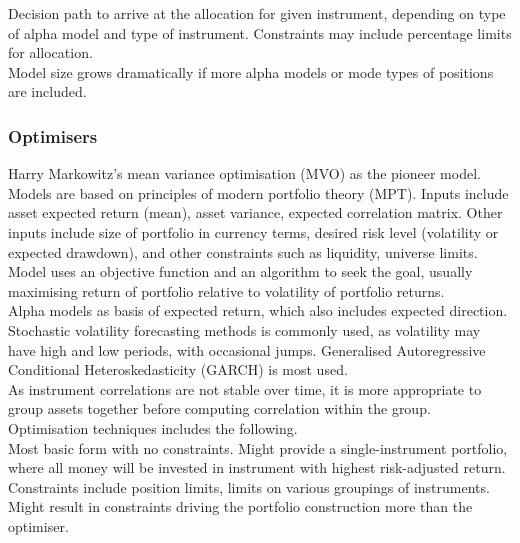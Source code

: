  Decision path to arrive at the allocation for given instrument, depending on type of alpha model and type of instrument. Constraints may include percentage limits for allocation.\\
Model size grows dramatically if more alpha models or mode types of positions are included.

\subsubsection{Optimisers}

Harry Markowitz's mean variance optimisation (MVO) as the pioneer model. Models are based on principles of modern portfolio theory (MPT). Inputs include asset expected return (mean), asset variance, expected correlation matrix. Other inputs include size of portfolio in currency terms, desired risk level (volatility or expected drawdown), and other constraints such as liquidity, universe limits.\\
Model uses an objective function and an algorithm to seek the goal, usually maximising return of portfolio relative to volatility of portfolio returns.\\

 Alpha models as basis of expected return, which also includes expected direction.\\

 Stochastic volatility forecasting methods is commonly used, as volatility may have high and low periods, with occasional jumps. Generalised Autoregressive Conditional Heteroskedasticity (GARCH) is most used. \\

 As instrument correlations are not stable over time, it is more appropriate to group assets together before computing correlation within the group.\\

Optimisation techniques includes the following.\\

 Most basic form with no constraints. Might provide a single-instrument portfolio, where all money will be invested in instrument with highest risk-adjusted return.\\

 Constraints include position limits, limits on various groupings of instruments. Might result in constraints driving the portfolio construction more than the optimiser.\\

